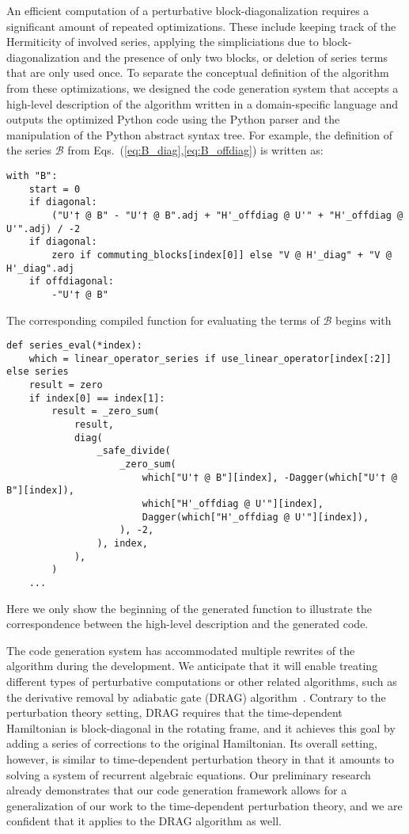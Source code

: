 An efficient computation of a perturbative block-diagonalization requires a significant amount of repeated optimizations.
These include keeping track of the Hermiticity of involved series, applying the simpliciations due to block-diagonalization and the presence of only two blocks, or deletion of series terms that are only used once.
To separate the conceptual definition of the algorithm from these optimizations, we designed the code generation system that accepts a high-level description of the algorithm written in a domain-specific language and outputs the optimized Python code using the Python parser and the manipulation of the Python abstract syntax tree.
For example, the definition of the series $\mathcal{B}$ from Eqs.~(\ref{eq:B_diag},\ref{eq:B_offdiag}) is written as:
\begin{verbatim}
with "B":
    start = 0
    if diagonal:
        ("U'† @ B" - "U'† @ B".adj + "H'_offdiag @ U'" + "H'_offdiag @ U'".adj) / -2
    if diagonal:
        zero if commuting_blocks[index[0]] else "V @ H'_diag" + "V @ H'_diag".adj
    if offdiagonal:
        -"U'† @ B"
\end{verbatim}
The corresponding compiled function for evaluating the terms of $\mathcal{B}$ begins with
\begin{verbatim}
def series_eval(*index):
    which = linear_operator_series if use_linear_operator[index[:2]] else series
    result = zero
    if index[0] == index[1]:
        result = _zero_sum(
            result,
            diag(
                _safe_divide(
                    _zero_sum(
                        which["U'† @ B"][index], -Dagger(which["U'† @ B"][index]),
                        which["H'_offdiag @ U'"][index],
                        Dagger(which["H'_offdiag @ U'"][index]),
                    ), -2,
                ), index,
            ),
        )
    ...
\end{verbatim}
Here we only show the beginning of the generated function to illustrate the correspondence between the high-level description and the generated code.

The code generation system has accommodated multiple rewrites of the algorithm during the development.
We anticipate that it will enable treating different types of perturbative computations or other related algorithms, such as the derivative removal by adiabatic gate (DRAG) algorithm~\cite{Motzoi_2009,Theis_2018}.
Contrary to the perturbation theory setting, DRAG requires that the time-dependent Hamiltonian is block-diagonal in the rotating frame, and it achieves this goal by adding a series of corrections to the original Hamiltonian.
Its overall setting, however, is similar to time-dependent perturbation theory in that it amounts to solving a system of recurrent algebraic equations.
Our preliminary research already demonstrates that our code generation framework allows for a generalization of our work to the time-dependent perturbation theory, and we are confident that it applies to the DRAG algorithm as well.
